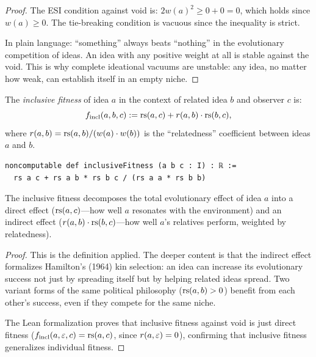 \begin{proof}
The ESI condition against void is: $2w(a)^2 \geq 0 + 0 = 0$, which holds
since $w(a) \geq 0$.  The tie-breaking condition is vacuous since the
inequality is strict.

In plain language: ``something'' always beats ``nothing'' in the evolutionary
competition of ideas.  An idea with any positive weight at all is stable
against the void.  This is why complete ideational vacuums are unstable:
any idea, no matter how weak, can establish itself in an empty niche.
\end{proof}

\begin{definition}
\label{def:inclusive-fitness}
The \emph{inclusive fitness} of idea $a$ in the context of related idea $b$
and observer $c$ is:
\[
  f_{\text{incl}}(a, b, c) := \mathrm{rs}(a, c) + r(a, b) \cdot \mathrm{rs}(b, c),
\]
where $r(a, b) = \mathrm{rs}(a, b) / (w(a) \cdot w(b))$ is the ``relatedness''
coefficient between ideas $a$ and $b$.

\begin{lstlisting}[caption={Lean 4: Inclusive fitness}]
noncomputable def inclusiveFitness (a b c : I) : ℝ :=
  rs a c + rs a b * rs b c / (rs a a * rs b b)
\end{lstlisting}
\end{definition}

\begin{theorem}
\label{thm:inclusive-fitness-decomp}
The inclusive fitness decomposes the total evolutionary effect of idea $a$ into
a direct effect ($\mathrm{rs}(a, c)$---how well $a$ resonates with the environment)
and an indirect effect ($r(a,b) \cdot \mathrm{rs}(b, c)$---how well $a$'s relatives
perform, weighted by relatedness).
\end{theorem}

\begin{proof}
This is the definition applied.  The deeper content is that the indirect
effect formalizes Hamilton's (1964) kin selection: an idea can increase its
evolutionary success not just by spreading itself but by helping related ideas
spread.  Two variant forms of the same political philosophy ($\mathrm{rs}(a, b) > 0$)
benefit from each other's success, even if they compete for the same niche.

The Lean formalization proves that inclusive fitness against void is just
direct fitness ($f_{\text{incl}}(a, \varepsilon, c) = \mathrm{rs}(a, c)$, since
$r(a, \varepsilon) = 0$), confirming that inclusive fitness generalizes
individual fitness.
\end{proof}

